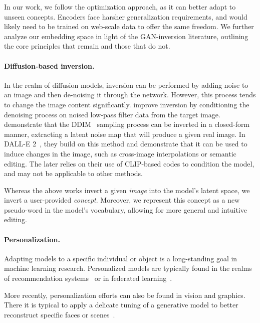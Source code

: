 In our work, we follow the optimization approach, as it can better adapt to unseen concepts. Encoders face harsher generalization requirements, and would likely need to be trained on web-scale data to offer the same freedom. We further analyze our embedding space in light of the GAN-inversion literature, outlining the core principles that remain and those that do not.

\paragraph{Diffusion-based inversion.}
In the realm of diffusion models, inversion can be performed  by adding noise to an image and then de-noising it through the network. However, this process tends to change the image content significantly. \citet{choi2021ilvr} improve inversion by conditioning the denoising process on noised low-pass filter data from the target image.
\citep{dhariwal2021diffusion} demonstrate that the DDIM~\citep{song2020denoising} sampling process can be inverted in a closed-form manner, extracting a latent noise map that will produce a given real image. In DALL-E 2~\citep{ramesh2022hierarchical}, they build on this method and demonstrate that it can be used to induce changes in the image, such as cross-image interpolations or semantic editing. The later relies on their use of CLIP-based codes to condition the model, and may not be applicable to other methods.

Whereas the above works invert a given \textit{image} into the model's latent space, we invert a user-provided \textit{concept}. Moreover, we represent this concept as a new pseudo-word in the model's vocabulary, allowing for more general and intuitive editing.


\paragraph{Personalization.}
Adapting models to a specific individual or object is a long-standing goal in machine learning research. Personalized models are typically found in the realms of recommendation systems~\citep{benhamdi2017personalized,fernando2018artwork,martinez2009s,cho2002personalized} or in federated learning~\citep{mansour2020three,jiang2019improving,fallah2020personalized,shamsian2021personalized}.

More recently, personalization efforts can also be found in vision and graphics. There it is typical to apply a delicate tuning of a generative model to better reconstruct specific faces or scenes~\citep{semantic2019bau,roich2021pivotal,alaluf2021hyperstyle,dinh2022hyperinverter,cao2022authentic,nitzan2022mystyle}. 

